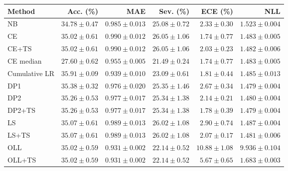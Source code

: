 \begin{tabular}{lrrrrr}
\toprule
Method & Acc. (\%) & MAE & Sev. (\%) & ECE (\%) & NLL \\
\midrule
NB & $34.78\!\pm\!0.47$ & $0.985\!\pm\!0.013$ & $25.08\!\pm\!0.72$ & $2.33\!\pm\!0.30$ & $1.523\!\pm\!0.004$ \\
CE & $35.02\!\pm\!0.61$ & $0.990\!\pm\!0.012$ & $26.05\!\pm\!1.06$ & $1.74\!\pm\!0.77$ & $1.483\!\pm\!0.005$ \\
CE+TS & $35.02\!\pm\!0.61$ & $0.990\!\pm\!0.012$ & $26.05\!\pm\!1.06$ & $2.03\!\pm\!0.23$ & $1.482\!\pm\!0.006$ \\
CE median & $27.60\!\pm\!0.62$ & $0.955\!\pm\!0.005$ & $21.49\!\pm\!0.24$ & $1.74\!\pm\!0.77$ & $1.483\!\pm\!0.005$ \\
Cumulative LR & $35.91\!\pm\!0.09$ & $0.939\!\pm\!0.010$ & $23.09\!\pm\!0.61$ & $1.81\!\pm\!0.44$ & $1.485\!\pm\!0.013$ \\
DP1 & $35.38\!\pm\!0.32$ & $0.976\!\pm\!0.020$ & $25.35\!\pm\!1.46$ & $2.67\!\pm\!0.34$ & $1.479\!\pm\!0.004$ \\
DP2 & $35.26\!\pm\!0.53$ & $0.977\!\pm\!0.017$ & $25.34\!\pm\!1.38$ & $2.14\!\pm\!0.21$ & $1.480\!\pm\!0.004$ \\
DP2+TS & $35.26\!\pm\!0.53$ & $0.977\!\pm\!0.017$ & $25.34\!\pm\!1.38$ & $1.78\!\pm\!0.39$ & $1.479\!\pm\!0.004$ \\
LS & $35.07\!\pm\!0.61$ & $0.989\!\pm\!0.013$ & $26.02\!\pm\!1.08$ & $2.90\!\pm\!0.74$ & $1.487\!\pm\!0.004$ \\
LS+TS & $35.07\!\pm\!0.61$ & $0.989\!\pm\!0.013$ & $26.02\!\pm\!1.08$ & $2.07\!\pm\!0.17$ & $1.481\!\pm\!0.006$ \\
OLL & $35.02\!\pm\!0.59$ & $0.931\!\pm\!0.002$ & $22.14\!\pm\!0.52$ & $10.88\!\pm\!1.08$ & $9.936\!\pm\!0.104$ \\
OLL+TS & $35.02\!\pm\!0.59$ & $0.931\!\pm\!0.002$ & $22.14\!\pm\!0.52$ & $5.67\!\pm\!0.65$ & $1.683\!\pm\!0.003$ \\
\bottomrule
\end{tabular}